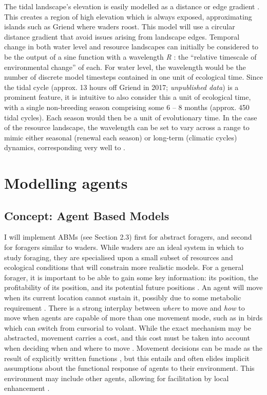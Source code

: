 The tidal landscape's elevation is easily modelled as a distance or edge gradient \citep{etherington2015}. This creates a region of high elevation which is always exposed, approximating islands such as Griend where waders roost. This model will use a circular distance gradient that avoid issues arising from landscape edges. Temporal change in both water level and resource landscapes can initially be considered to be the output of a sine function with a wavelength \emph{R} \citep[as in][]{botero2015}: the ``relative timescale of environmental change'' of each. For water level, the wavelength would be the number of discrete model timesteps contained in one unit of ecological time. Since the tidal cycle (approx. 13 hours off Griend in 2017; \emph{unpublished data}) is a prominent feature, it is intuitive to also consider this a unit of ecological time, with a single non-breeding season comprising some 6 -- 8 months (approx. 450 tidal cycles). Each season would then be a unit of evolutionary time. In the case of the resource landscape, the wavelength can be set to vary across a range to mimic either seasonal (renewal each season) or long-term (climatic cycles) dynamics, corresponding very well to \citet{botero2015}.

\section{Modelling agents}

\subsection{Concept: Agent Based Models}

I will implement ABMs (see Section 2.3) first for abstract foragers, and second for foragers similar to waders. While waders are an ideal system in which to study foraging, they are specialised upon a small subset of resources and ecological conditions that will constrain more realistic models. For a general forager, it is important to be able to gain some key information: its position, the profitability of its position, and its potential future positions \citep[\emph{why} and \emph{where} to move;][]{nathan2008a}. An agent will move when its current location cannot sustain it, possibly due to some metabolic requirement \citep{barraquand2008}. There is a strong interplay between \emph{where} to move and \emph{how} to move when agents are capable of more than one movement mode, such as in birds which can switch from cursorial to volant. While the exact mechanism may be abstracted, movement carries a cost, and this cost must be taken into account when deciding when and where to move \citep{charnov1976a}. Movement decisions can be made as the result of explicitly written functions \citep[e.g.][]{getz2015}, but this entails and often elides implicit assumptions about the functional response of agents to their environment. This environment may include other agents, allowing for facilitation by local enhancement \citep{beauchamp2013}.

